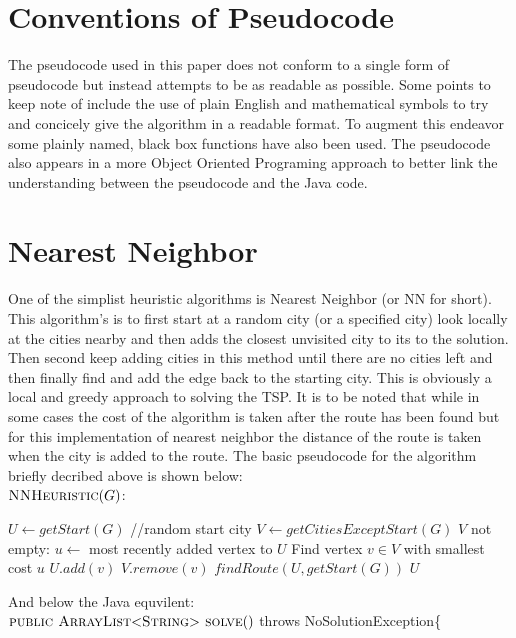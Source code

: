 \documentclass[midd]{thesis}
\newcommand{\tab}{\hspace*{2em}}
\begin{document}
\section{Conventions of Pseudocode}
\tab The pseudocode used in this paper does not conform to a single form of pseudocode but instead attempts to be as readable as possible. Some points to keep note of include the use of plain English and mathematical symbols to try and concicely give the algorithm in a readable format. To augment this endeavor some plainly named, black box functions have also been used. The pseudocode also appears in a more Object Oriented Programing approach to better link the understanding between the pseudocode and the Java code.
\section{Nearest Neighbor}
\tab One of the simplist heuristic algorithms is Nearest Neighbor (or NN for short). This algorithm's is to first start at a random city (or a specified city) look locally at the cities nearby and then adds the closest unvisited city to its to the solution. Then second keep adding cities in this method until there are no cities left and then finally find and add the edge back to the starting city. This is obviously a local and greedy approach to solving the TSP. It is to be noted that while in some cases the cost of the algorithm is taken after the route has been found but for this implementation of nearest neighbor the distance of the route is taken when the city is added to the route. The basic pseudocode for the algorithm briefly decribed above is shown below:\\
$\textnormal{\scshape NNHeuristic}(G)$:
\begin{codebox}
\li $U \gets getStart(G)$ //random start city
\li $V \gets getCitiesExceptStart(G)$
\li\While $V$ not empty:
\li $u \gets$ most recently added vertex to $U$
\li Find vertex $v \in V$ with smallest cost $u$
\li $U.add(v)$
\li $V.remove(v)$\End
\li $findRoute(U, getStart(G))$
\li\Return $U$
\end{codebox}
And below the Java equvilent:\\
$\textnormal{\scshape public ArrayList$<$String$>$ solve}()$ throws NoSolutionException\{
\end{document}
